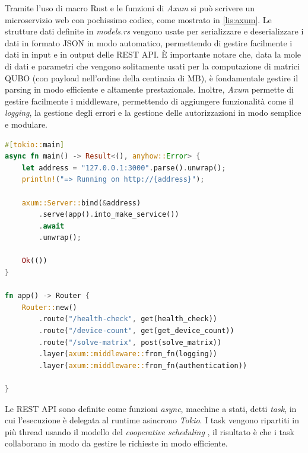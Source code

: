 
Tramite l'uso di macro Rust e le funzioni di \textit{Axum} si può scrivere un microservizio web con pochissimo codice, come mostrato in \ref{lis:axum}. Le strutture dati definite in \textit{models.rs} vengono usate per serializzare e deserializzare i dati in formato \gls{JSON} in modo automatico, permettendo di gestire facilmente i dati in input e in output delle REST \gls{API}. È importante notare che, data la mole di dati e parametri che vengono solitamente usati per la computazione di matrici \gls{QUBO} (con payload nell'ordine della centinaia di MB), è fondamentale gestire il parsing in modo efficiente e altamente prestazionale.
Inoltre, \textit{Axum} permette di gestire facilmente i middleware, permettendo di aggiungere funzionalità come il \textit{logging}, la gestione degli errori e la gestione delle autorizzazioni in modo semplice e modulare.

\vspace{5mm}
\begin{lstlisting}[language=Rust, caption=Inizializzazione Axum, label=lis:axum]
#[tokio::main]
async fn main() -> Result<(), anyhow::Error> {
    let address = "127.0.0.1:3000".parse().unwrap();
    println!("=> Running on http://{address}");

    axum::Server::bind(&address)
        .serve(app().into_make_service())
        .await
        .unwrap();

    Ok(())
}

fn app() -> Router {
    Router::new()
        .route("/health-check", get(health_check))
        .route("/device-count", get(get_device_count))
        .route("/solve-matrix", post(solve_matrix))
        .layer(axum::middleware::from_fn(logging))
        .layer(axum::middleware::from_fn(authentication))

}
\end{lstlisting}
\vspace{5mm}

Le REST \gls{API} sono definite come funzioni \textit{async}, macchine a stati, detti \textit{task}, in cui l'esecuzione è delegata al runtime asincrono \textit{Tokio}. I task vengono ripartiti in più thread usando il modello del \textit{cooperative scheduling} \cite[]{Rust:Tokio_sched}, il risultato è che i task collaborano in modo da gestire le richieste in modo efficiente.

